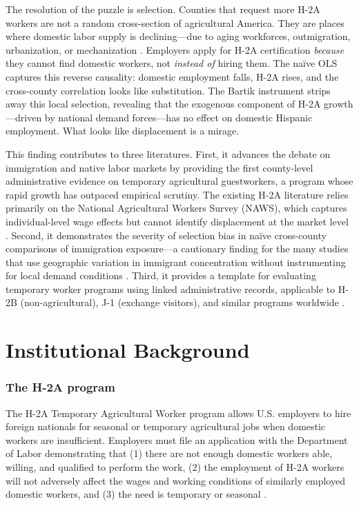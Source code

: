 \documentclass[12pt]{article}
\begin{document}
The resolution of the puzzle is selection. Counties that request more H-2A workers are not a random cross-section of agricultural America. They are places where domestic labor supply is declining---due to aging workforces, outmigration, urbanization, or mechanization \citep{Taylor2012, Fan2015, Charlton2019}. Employers apply for H-2A certification \textit{because} they cannot find domestic workers, not \textit{instead of} hiring them. The na\"ive OLS captures this reverse causality: domestic employment falls, H-2A rises, and the cross-county correlation looks like substitution. The Bartik instrument strips away this local selection, revealing that the exogenous component of H-2A growth---driven by national demand forces---has no effect on domestic Hispanic employment. What looks like displacement is a mirage.

This finding contributes to three literatures. First, it advances the debate on immigration and native labor markets \citep{Borjas2003, Card2005, Dustmann2016, Peri2016} by providing the first county-level administrative evidence on temporary agricultural guestworkers, a program whose rapid growth has outpaced empirical scrutiny. The existing H-2A literature relies primarily on the National Agricultural Workers Survey (NAWS), which captures individual-level wage effects but cannot identify displacement at the market level \citep{Rutledge2024}. Second, it demonstrates the severity of selection bias in na\"ive cross-county comparisons of immigration exposure---a cautionary finding for the many studies that use geographic variation in immigrant concentration without instrumenting for local demand conditions \citep{Jaeger2018}. Third, it provides a template for evaluating temporary worker programs using linked administrative records, applicable to H-2B (non-agricultural), J-1 (exchange visitors), and similar programs worldwide \citep{Clemens2018}.

\section{Institutional Background}

\subsubsection*{The H-2A program} The H-2A Temporary Agricultural Worker program allows U.S. employers to hire foreign nationals for seasonal or temporary agricultural jobs when domestic workers are insufficient. Employers must file an application with the Department of Labor demonstrating that (1) there are not enough domestic workers able, willing, and qualified to perform the work, (2) the employment of H-2A workers will not adversely affect the wages and working conditions of similarly employed domestic workers, and (3) the need is temporary or seasonal \citep{DOL2023}.
\end{document}
